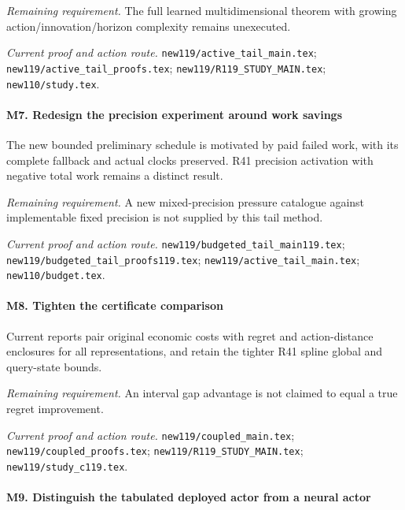 \par\emph{Remaining requirement.} The full learned multidimensional theorem with growing action/\allowbreak{}innovation/\allowbreak{}horizon complexity remains unexecuted.

\par\emph{Current proof and action route.} \nolinkurl{new119/active_tail_main.tex}; \nolinkurl{new119/active_tail_proofs.tex}; \nolinkurl{new119/R119_STUDY_MAIN.tex}; \nolinkurl{new110/study.tex}.

\paragraph{M7. Redesign the precision experiment around work savings}

The new bounded preliminary schedule is motivated by paid failed work, with its complete fallback and actual clocks preserved. R41 precision activation with negative total work remains a distinct result.

\par\emph{Remaining requirement.} A new mixed-precision pressure catalogue against implementable fixed precision is not supplied by this tail method.

\par\emph{Current proof and action route.} \nolinkurl{new119/budgeted_tail_main119.tex}; \nolinkurl{new119/budgeted_tail_proofs119.tex}; \nolinkurl{new119/active_tail_main.tex}; \nolinkurl{new110/budget.tex}.

\paragraph{M8. Tighten the certificate comparison}

Current reports pair original economic costs with regret and action-distance enclosures for all representations, and retain the tighter R41 spline global and query-state bounds.

\par\emph{Remaining requirement.} An interval gap advantage is not claimed to equal a true regret improvement.

\par\emph{Current proof and action route.} \nolinkurl{new119/coupled_main.tex}; \nolinkurl{new119/coupled_proofs.tex}; \nolinkurl{new119/R119_STUDY_MAIN.tex}; \nolinkurl{new119/study_c119.tex}.

\paragraph{M9. Distinguish the tabulated deployed actor from a neural actor}

